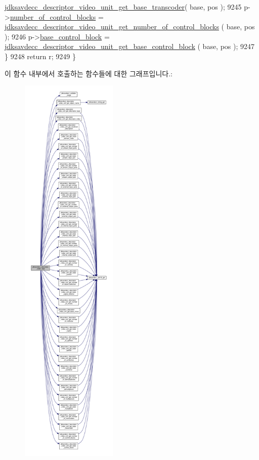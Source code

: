 \begin{DoxyCode}
      \hyperlink{group__descriptor__video_ga7192f382e3aabcab39de91a422401556}{jdksavdecc\_descriptor\_video\_unit\_get\_base\_transcoder}( 
      base, pos );
9245         p->\hyperlink{structjdksavdecc__descriptor__video__unit_a564f961a8cec6e8f7b4bfdbbbfe650d4}{number\_of\_control\_blocks} = 
      \hyperlink{group__descriptor__video_ga799f41ec67f57dd63f001a11d6e02dc0}{jdksavdecc\_descriptor\_video\_unit\_get\_number\_of\_control\_blocks}
      ( base, pos );
9246         p->\hyperlink{structjdksavdecc__descriptor__video__unit_a9303491ec92ba42c28fb904c14d310b0}{base\_control\_block} = 
      \hyperlink{group__descriptor__video_gafc1a9610a275d7ba4c434cc62fa9b65b}{jdksavdecc\_descriptor\_video\_unit\_get\_base\_control\_block}
      ( base, pos );
9247     \}
9248     \textcolor{keywordflow}{return} r;
9249 \}
\end{DoxyCode}


이 함수 내부에서 호출하는 함수들에 대한 그래프입니다.\+:
\nopagebreak
\begin{figure}[H]
\begin{center}
\leavevmode
\includegraphics[height=550pt]{group__descriptor__video_ga4e4a693f9c9a72de4a600df91df075d2_cgraph}
\end{center}
\end{figure}



